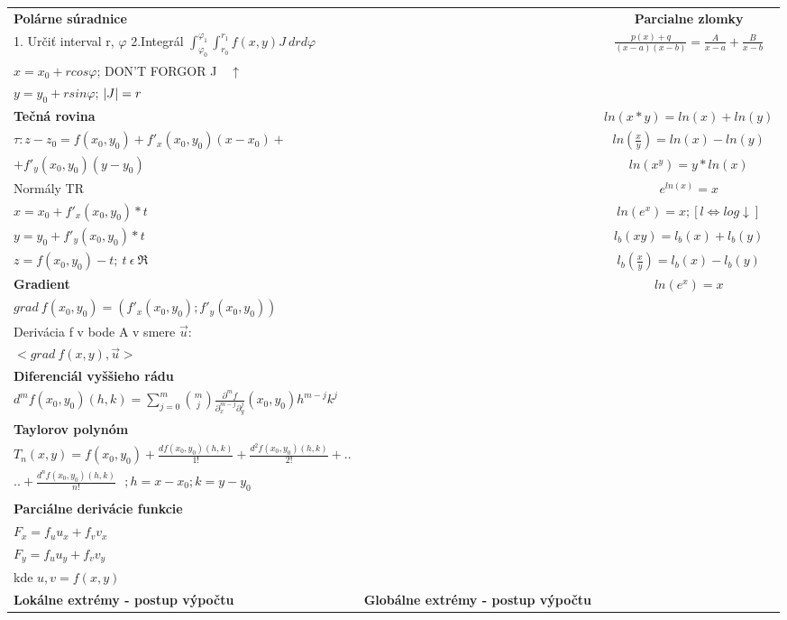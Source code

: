 \documentclass[8pt]{extarticle}
\begin{document}
\begin{tabular}{l|l|c}
\hline
\textbf{Polárne súradnice} &  & \textbf{Parcialne zlomky}\\
1. Určiť interval r, $\varphi$ 2.Integrál $\int_{\varphi_0}^{\varphi_1}\int_{r_0}^{r_1}f(x,y)J~drd\varphi$ & & $\frac{p(x)+q}{(x-a)(x-b)}=\frac{A}{x-a}+\frac{B}{x-b}$ \\
$x = x_0 + r cos\varphi$; \hspace{10mm} DON'T FORGOR J~~$\uparrow$ & & \\
$y = y_0 + r sin\varphi$; $\arrowvert{}J\arrowvert{}=r$ & \\

\hline
\textbf{Tečná rovina} & & $ln(x*y)=ln(x)+ln(y)$ \\

$\tau:z-z_0=f(x_0,y_0)+f'_x(x_0,y_0)(x-x_0)+$ & & $ln(\frac{x}{y})=ln(x)-ln(y)$ \\

$+ f'_y(x_0,y_0)(y-y_0)$ & & $ln(x^y)=y*ln(x)$ \\

Normály TR & & $e^{ln(x)}=x$ \\

$x=x_0+f'_x(x_0,y_0)*t$ & & $ln(e^x)=x; [l\Leftrightarrow log\downarrow] $\\
$y=y_0+f'_y(x_0,y_0)*t$ & & $l_b(xy)=l_b(x)+l_b(y)$  \\
$z=f(x_0,y_0)-t ;~ t ~\epsilon~ \Re$ & & $l_b(\frac{x}{y})=l_b(x)-l_b(y)$ \\
\hline
\textbf{Gradient} & & $ln(e^x)=x$ \\
$grad~ f(x_0,y_0)=(f'_x(x_0,y_0);f'_y(x_0,y_0))$ & \\
Derivácia f v bode A v smere $\vec{u}$: & \\
$<grad~f(x,y), \vec{u}>$ & \\
\hline
\textbf{Diferenciál vyššieho rádu} & \\
$d^m f(x_0,y_0)(h,k)=\sum\limits_{j=0}^m \binom{m}{j}\frac{\partial^m f}{\partial^{m-j}_x \partial^j_y}(x_0,y_0) h^{m-j}k^j$ & \\
\hline

\textbf{Taylorov polynóm} & \\
$T_n(x,y)=f(x_0,y_0)+\frac{df(x_0,y_0)(h,k)}{1!}+\frac{d^2f(x_0,y_0)(h,k)}{2!}+..$ & \\
$..+\frac{d^nf(x_0,y_0)(h,k)}{n!}~~~;h=x-x_0;k=y-y_0$ & \\
 &\\
\hline
\textbf{Parciálne derivácie funkcie} & \\
$F_x=f_uu_x+f_vv_x$ & \\
$F_y=f_uu_y+f_vv_y$ & \\
kde $u,v = f(x,y)$ & \\
\hline
\textbf{Lokálne extrémy - postup výpočtu} & \textbf{Globálne extrémy - postup výpočtu} & \\


\end{tabular}
\end{document}
